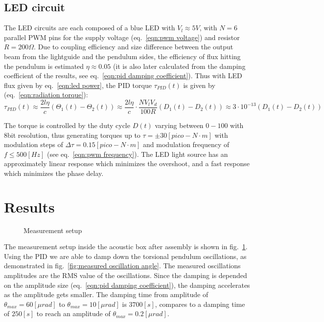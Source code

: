 \documentclass[\main/master.tex]{subfiles}
\begin{document}
\subsection{LED circuit}
The LED circuits are each composed of a blue LED with $V_l\approx 5V$, with $N=6$ parallel PWM pins for the supply voltage (eq.~\ref{eqn:pwm voltage}) and resistor $R = 200\Omega$. Due to coupling efficiency and size difference between the output beam from the lightguide and the pendulum sides, the efficiency of flux hitting the pendulum is estimated $\eta \approx 0.05$ (it is also later calculated from the damping coefficient of the results, see eq.~\ref{eqn:pid damping coefficient}). Thus with LED flux given by eq.~\ref{eqn:led power}, the PID torque $\tau_{PID}(t)$ is given by (eq.~\ref{eqn:radiation torque}):
\begin{equation}
\tau_{PID}(t) \approx \frac{2l\eta}{{c}} (\Theta_1(t) -\Theta_2(t)) \approx \frac{2l\eta}{{c}} \cdot\frac{N V_l V_d}{100R}(D_1(t) -D_2(t))  \approx   3\cdot 10^{-13}(D_1(t) -D_2(t)) 
\label{eqn:led torque}
\end{equation}
\par\noindent
The torque is controlled by the duty cycle $D(t)$ varying between $0-100$ with 8bit resolution, thus generating torques up to $\tau = \pm 30 [pico-N\cdot m]$ with modulation steps of $\Delta\tau = 0.15 [pico-N\cdot m]$ and modulation frequency of $f \leq 500[Hz]$ (see eq.~\ref{eqn:pwm frequency}). The LED light source has an approximately linear response which minimizes the overshoot, and a fast response which minimizes the phase delay.
\section{Results} 
\begin{figure}[htbp]
	\centering
	\caption[Measurement setup]{Measurement setup}
	\label{fig:actual system}
\end{figure}
\FloatBarrier
The measurement setup inside the acoustic box after assembly is shown in fig.~\ref{fig:actual system}. Using the PID we are able to damp down the torsional pendulum oscillations, as demonstrated in fig.~\ref{fig:measured oscillation angle}. The measured oscillations amplitudes are the RMS value of the oscillations. Since the damping is depended on the amplitude size (eq.~\ref{eqn:pid damping coefficient}), the damping accelerates as the amplitude gets smaller. The damping time from amplitude of $\theta_{max} = 60 [\mu rad] $ to $\theta_{max} = 10[\mu rad] $ is $3700[s]$, compares to a damping time of $250[s]$ to reach an amplitude of $\theta_{max} = 0.2[\mu rad]$.
\end{document}
